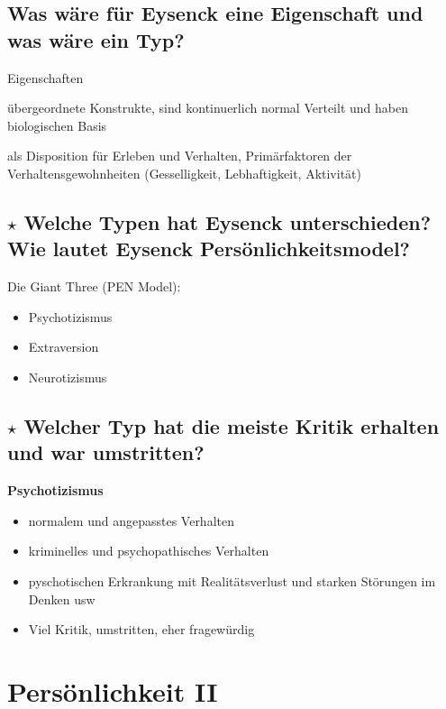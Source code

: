 \documentclass[a4paper,9pt,DIV=14]{scrartcl}
\begin{document}
\subsection{Was wäre für Eysenck eine Eigenschaft und was wäre ein Typ?}
    \begin{labeling}{Eigenschaften}
        \item [Typen] übergeordnete Konstrukte, sind kontinuerlich normal Verteilt und haben biologischen Basis
        \item [Eigenschaften] als Disposition für Erleben und Verhalten, Primärfaktoren der Verhaltensgewohnheiten (Gesselligkeit, Lebhaftigkeit, Aktivität)
    \end{labeling}
\subsection{$\star$ Welche Typen hat Eysenck unterschieden? Wie lautet Eysenck Persönlichkeitsmodel?} %
    Die Giant Three (PEN Model):\\
    \begin{itemize}
    \item Psychotizismus
    \item Extraversion
    \item Neurotizismus
    \end{itemize}
\subsection{$\star$ Welcher Typ hat die meiste Kritik erhalten und war umstritten?} %
    \textbf{Psychotizismus}\\
    \begin{itemize}
    \item normalem und angepasstes Verhalten
    \item kriminelles und psychopathisches Verhalten
    \item pyschotischen Erkrankung mit Realitätsverlust und starken Störungen im Denken usw
    \item Viel Kritik, umstritten, eher fragewürdig
    \end{itemize}

\section{Persönlichkeit II}
\end{document}
